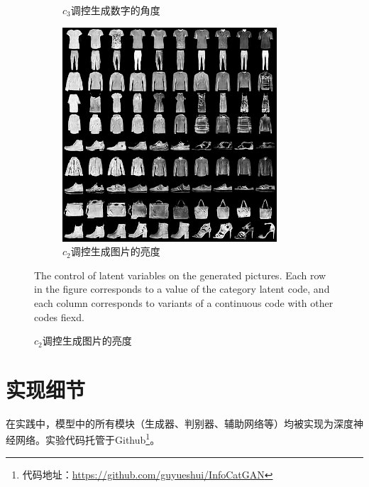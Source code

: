 \begin{figure}[htb]
\begin{subfigure}[b]{\trif\textwidth}
    \caption{$c_3$调控生成数字的角度}
    \label{ffig:m-icg-rotation}
  \end{subfigure} 
  \begin{subfigure}[b]{\trif\textwidth}
    \includegraphics[width=\textwidth]{Img/icg-light.png}
    \caption{$c_2$调控生成图片的亮度}
    \label{ffig:fa-icg-light}
  \end{subfigure} 
  {The control of latent variables on the generated pictures. Each row in the figure corresponds to a value of the category latent code, and each column corresponds to variants of a continuous code with other codes fiexd.}
  \label{fig:latent-varies}
\end{figure}

\section{实现细节}
在实践中，模型中的所有模块（生成器、判别器、辅助网络等）均被实现为深度神经网络。实验代码托管于Github\footnote{代码地址：\url{https://github.com/guyueshui/InfoCatGAN}}。


